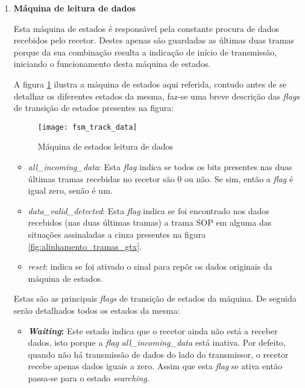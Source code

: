 \begin{enumerate}
	
	\item \textbf{Máquina de leitura de dados}
	 
	 Esta máquina de estados é responsável pela constante procura de dados recebidos pelo recetor. Destes apenas são guardadas as últimas duas tramas porque da sua combinação resulta a indicação de início de transmissão, iniciando o funcionamento desta máquina de estados.
	 
	 A figura \ref{fig:fsm2} ilustra a máquina de estados aqui referida, contudo antes de se detalhar os diferentes estados da mesma, faz-se uma breve descrição das \textit{flags} de transição de estados presentes na figura:

	 	\begin{figure}[h!]
	 		\begin{center}
	 			\leavevmode
	 			\texttt{[image: fsm\_track\_data]}
	 			\captionsetup{width=1.0\linewidth}
	 			\caption[Máquina de estados leitura de dados]{Máquina de estados leitura de dados}
	 			\label{fig:fsm2}
	 		\end{center}
		\end{figure}
	 
	\begin{itemize}
		\item \textit{all\_incoming\_data}: Esta \textit{flag} indica se todos os bits presentes nas duas últimas tramas recebidas no recetor são 0 ou não. Se sim, então a \textit{flag} é igual zero, senão é um.
		
		\item \textit{data\_valid\_detected}: Esta \textit{flag} indica se foi encontrado nos dados recebidos (nas duas últimas tramas) a trama SOP em alguma das situações assinaladas a cinza presentes na figura \ref{fig:alinhamento_tramas_gtx}.
		
		\item \textit{reset}: indica se foi ativado o sinal para repôr os dados originais da máquina de estados.
	\end{itemize}	 
	 
	 Estas são as principais \textit{flags} de transição de estados da máquina. De seguida serão detalhados todos os estados da mesma:
	 
	 	 \begin{itemize}
	 	\item \textbf{\textit{Waiting}:} Este estado indica que o recetor ainda não está a receber dados, isto porque a \textit{flag} \textit{all\_incoming\_data} está inativa. Por defeito, quando não há transmissão de dados do lado do transmissor, o recetor recebe apenas dados iguais a zero. Assim que esta \textit{flag} se ativa então passa-se para o estado \textit{searching}.
	 	

\end{itemize}
\end{enumerate}
